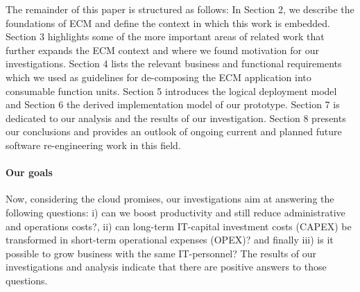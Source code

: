 \documentclass[EPiC]{easychair} %
\begin{document}
  The remainder of this paper is structured as follows: In Section 2, we describe the foundations of ECM and define the context in which this work is embedded. Section 3 highlights some of the more important areas of related work that further expands the ECM context and where we found motivation for our investigations. Section 4 lists the relevant business and functional requirements which we used as guidelines for de-composing the ECM application into consumable function units. Section 5 introduces the logical deployment model and Section 6 the derived implementation model of our prototype. Section 7 is dedicated to our analysis and the results of our investigation. Section 8 presents our conclusions and provides an outlook of ongoing current and planned future software re-engineering work in this field. 

  \noindent \paragraph{\textbf{Our goals}} Now, considering the cloud promises, our investigations aim at answering the following questions: i) can we boost productivity and still reduce administrative and operations costs?, ii) can long-term IT-capital investment costs (CAPEX) be transformed in short-term operational expenses (OPEX)? and finally iii) is it possible to grow business with the same IT-personnel? The results of our investigations and analysis indicate that there are positive answers to those questions.
    
\end{document}
